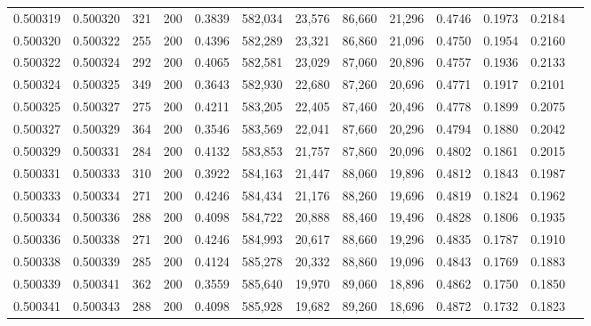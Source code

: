 \begin{tabular}{rrrrrrrrrrrrr}
0.500319 & 0.500320 &    321 & 200 &                                     0.3839 & 582,034 &  23,576 &  86,660 &  21,296 & 0.4746 & 0.1973 & 0.2184 \\
0.500320 & 0.500322 &    255 & 200 &                                     0.4396 & 582,289 &  23,321 &  86,860 &  21,096 & 0.4750 & 0.1954 & 0.2160 \\
0.500322 & 0.500324 &    292 & 200 &                                     0.4065 & 582,581 &  23,029 &  87,060 &  20,896 & 0.4757 & 0.1936 & 0.2133 \\
0.500324 & 0.500325 &    349 & 200 &                                     0.3643 & 582,930 &  22,680 &  87,260 &  20,696 & 0.4771 & 0.1917 & 0.2101 \\
0.500325 & 0.500327 &    275 & 200 &                                     0.4211 & 583,205 &  22,405 &  87,460 &  20,496 & 0.4778 & 0.1899 & 0.2075 \\
0.500327 & 0.500329 &    364 & 200 &                                     0.3546 & 583,569 &  22,041 &  87,660 &  20,296 & 0.4794 & 0.1880 & 0.2042 \\
0.500329 & 0.500331 &    284 & 200 &                                     0.4132 & 583,853 &  21,757 &  87,860 &  20,096 & 0.4802 & 0.1861 & 0.2015 \\
0.500331 & 0.500333 &    310 & 200 &                                     0.3922 & 584,163 &  21,447 &  88,060 &  19,896 & 0.4812 & 0.1843 & 0.1987 \\
0.500333 & 0.500334 &    271 & 200 &                                     0.4246 & 584,434 &  21,176 &  88,260 &  19,696 & 0.4819 & 0.1824 & 0.1962 \\
0.500334 & 0.500336 &    288 & 200 &                                     0.4098 & 584,722 &  20,888 &  88,460 &  19,496 & 0.4828 & 0.1806 & 0.1935 \\
0.500336 & 0.500338 &    271 & 200 &                                     0.4246 & 584,993 &  20,617 &  88,660 &  19,296 & 0.4835 & 0.1787 & 0.1910 \\
0.500338 & 0.500339 &    285 & 200 &                                     0.4124 & 585,278 &  20,332 &  88,860 &  19,096 & 0.4843 & 0.1769 & 0.1883 \\
0.500339 & 0.500341 &    362 & 200 &                                     0.3559 & 585,640 &  19,970 &  89,060 &  18,896 & 0.4862 & 0.1750 & 0.1850 \\
0.500341 & 0.500343 &    288 & 200 &                                     0.4098 & 585,928 &  19,682 &  89,260 &  18,696 & 0.4872 & 0.1732 & 0.1823 \\

\end{tabular}
